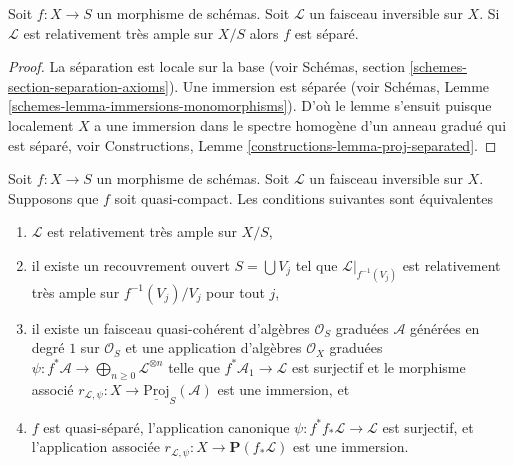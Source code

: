 \begin{lemma}
\label{lemma-relatively-very-ample-separated}
Soit $f : X \to S$ un morphisme de schémas. Soit $\mathcal{L}$
un faisceau inversible sur $X$. Si $\mathcal{L}$
est relativement très ample sur $X/S$ alors $f$
est séparé.
\end{lemma}

\begin{proof}
La séparation est locale sur la base
(voir Schémas, section \ref{schemes-section-separation-axioms}). Une immersion
est séparée
(voir Schémas, Lemme \ref{schemes-lemma-immersions-monomorphisms}). D'où le lemme s'ensuit
puisque localement $X$ a une immersion
dans le spectre homogène d'un anneau gradué qui est
séparé, voir Constructions, Lemme \ref{constructions-lemma-proj-separated}.
\end{proof}

\begin{lemma}
\label{lemma-relatively-very-ample}
Soit $f : X \to S$ un morphisme de schémas. Soit $\mathcal{L}$
un faisceau inversible sur $X$. Supposons que $f$
soit quasi-compact. Les conditions suivantes sont
équivalentes
\begin{enumerate}
\item $\mathcal{L}$ est relativement très ample sur $X/S$,
\item il existe un recouvrement ouvert $S = \bigcup V_j$ tel
que $\mathcal{L}|_{f^{-1}(V_j)}$ est relativement très ample sur $f^{-1}(V_j)/V_j$
pour tout $j$,
\item il existe un faisceau quasi-cohérent
d'algèbres $\mathcal{O}_S$ graduées
$\mathcal{A}$ générées en degré $1$ sur $\mathcal{O}_S$
et une application d'algèbres $\mathcal{O}_X$
graduées $\psi : f^*\mathcal{A} \to \bigoplus_{n \geq 0} \mathcal{L}^{\otimes n}$ telle que $f^*\mathcal{A}_1 \to \mathcal{L}$
est surjectif
et le morphisme associé $r_{\mathcal{L}, \psi} : X \to \underline{\text{Proj}}_S(\mathcal{A})$ est une immersion,
et
\item $f$ est quasi-séparé,
l'application canonique $\psi : f^*f_*\mathcal{L} \to \mathcal{L}$ est surjectif,
et l'application associée $r_{\mathcal{L}, \psi} : X \to \mathbf{P}(f_*\mathcal{L})$ est une
immersion.
\end{enumerate}
\end{lemma}

